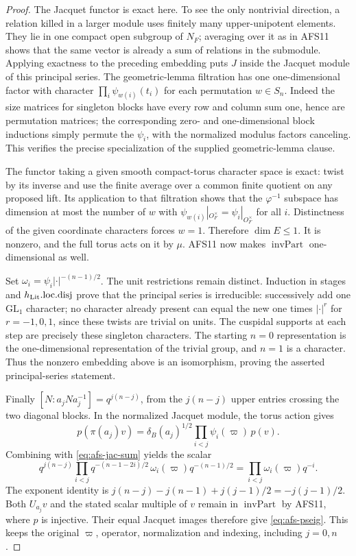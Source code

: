 \documentclass[11pt,a4paper]{article}
\numberwithin{equation}{section}
\theoremstyle{remark}\newtheorem{remark}[theorem]{Remark}
\begin{document}
\begin{proof}
The Jacquet functor is exact here.  To see the only
nontrivial direction, a relation killed in a larger module
uses finitely many upper-unipotent elements.  They lie in
one compact open subgroup of $N_F$; averaging over it as
in AFS11 shows that the same vector is already a sum of
relations in the submodule.  Applying exactness to the
preceding embedding puts $J$ inside the Jacquet module
of this principal series.  The geometric-lemma filtration
has one one-dimensional factor with character
$\prod_i\psi_{w(i)}(t_i)$ for each permutation $w\in S_n$.
Indeed the size matrices for singleton blocks have every
row and column sum one, hence are permutation matrices;
the corresponding zero- and one-dimensional block
inductions simply permute the $\psi_i$, with the normalized
modulus factors canceling.  This verifies the precise
specialization of the supplied geometric-lemma clause.

The functor taking a given smooth compact-torus character
space is exact: twist by its inverse and use the finite
average over a common finite quotient on any proposed
lift.  Its application to that filtration shows that the
$\varphi^{-1}$ subspace has dimension at most the number
of $w$ with
$\psi_{w(i)}|_{O_F^\times}=\psi_i|_{O_F^\times}$ for all $i$.
Distinctness of the given coordinate characters forces
$w=1$.  Therefore $\dim E\leq1$.  It is nonzero, and the
full torus acts on it by $\mu$.  AFS11 now makes
$\operatorname{invPart}$ one-dimensional as well.

Set $\omega_i=\psi_i|\cdot|^{-(n-1)/2}$.  The unit
restrictions remain distinct.  Induction in stages and
$h_{\rm Lit}.\mathrm{loc.disj}$ prove that the principal
series is irreducible: successively add one $\mathrm{GL}_1$
character; no character already present can equal the
new one times $|\cdot|^r$ for $r=-1,0,1$, since these
twists are trivial on units.  The cuspidal supports at
each step are precisely these singleton characters.
The starting $n=0$ representation is the one-dimensional
representation of the trivial group, and $n=1$ is a
character.  Thus the nonzero embedding above is an
isomorphism, proving the asserted principal-series statement.

Finally $[N:a_jNa_j^{-1}]=q^{j(n-j)}$, from the $j(n-j)$
upper entries crossing the two diagonal blocks.  In the
normalized Jacquet module, the torus action gives
\[
 p(\pi(a_j)v)=\delta_B(a_j)^{1/2}
                 \prod_{i<j}\psi_i(\varpi)\,p(v).
\]
Combining with \eqref{eq:afs-jac-sum} yields the scalar
\[
 q^{j(n-j)}\prod_{i<j}
     q^{-(n-1-2i)/2}\,
     \omega_i(\varpi)q^{-(n-1)/2}
   =\prod_{i<j}\omega_i(\varpi)q^{-i}.
\]
The exponent identity is
$j(n-j)-j(n-1)+j(j-1)/2=-j(j-1)/2$.
Both $U_{a_j}v$ and the stated scalar multiple of $v$
remain in $\operatorname{invPart}$ by AFS11, where $p$
is injective.  Their equal Jacquet images therefore give
\eqref{eq:afs-pseig}.  This keeps the original $\varpi$,
operator, normalization and indexing, including $j=0,n$.
\end{proof}
\end{document}
